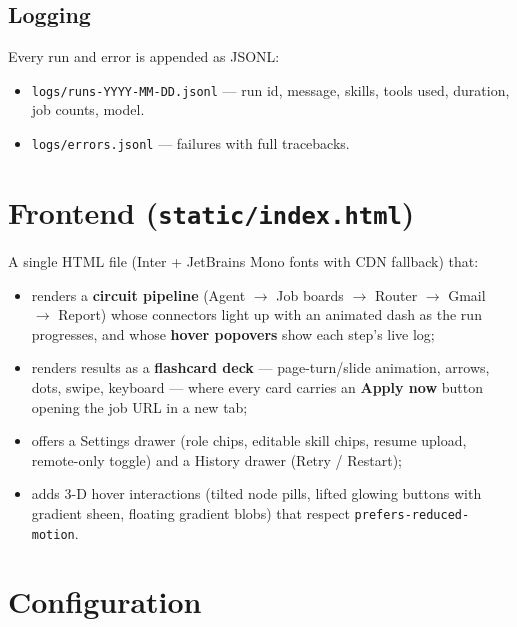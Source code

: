 \documentclass[11pt,a4paper]{article}
\newcommand{\file}[1]{\texttt{\small #1}}
\begin{document}
\subsection{Logging}
Every run and error is appended as JSONL:
\begin{itemize}
  \item \file{logs/runs-YYYY-MM-DD.jsonl} — run id, message, skills, tools used,
        duration, job counts, model.
  \item \file{logs/errors.jsonl} — failures with full tracebacks.
\end{itemize}

\section{Frontend (\file{static/index.html})}
\label{sec:ui}

A single HTML file (Inter + JetBrains Mono fonts with CDN fallback) that:
\begin{itemize}
  \item renders a \textbf{circuit pipeline} (Agent \(\to\) Job boards \(\to\)
        Router \(\to\) Gmail \(\to\) Report) whose connectors light up with an
        animated dash as the run progresses, and whose \textbf{hover popovers}
        show each step's live log;
  \item renders results as a \textbf{flashcard deck} — page-turn/slide
        animation, arrows, dots, swipe, keyboard — where every card carries an
        \textbf{Apply now} button opening the job URL in a new tab;
  \item offers a Settings drawer (role chips, editable skill chips, resume
        upload, remote-only toggle) and a History drawer (Retry / Restart);
  \item adds 3-D hover interactions (tilted node pills, lifted glowing
        buttons with gradient sheen, floating gradient blobs) that respect
        \texttt{prefers-reduced-motion}.
\end{itemize}

\section{Configuration}
\label{sec:config}
\end{document}
